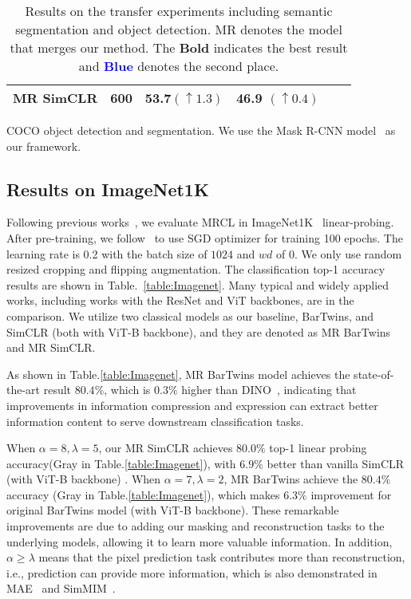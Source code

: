 \documentclass[10pt,twocolumn,letterpaper]{article}
\begin{document}
\begin{table*}[t!]
\begin{subtable}[h]{0.54\textwidth}
\begin{tabular}{l|ccccc}
         MR SimCLR & 600 & \textbf{53.7}$(\uparrow 1.3)$ & \textbf{46.9} $(\uparrow 0.4)$\\
         \bottomrule
    \end{tabular}
        \caption{COCO object detection and segmentation. We use the Mask R-CNN model~\cite{he2017mask} as our framework.}
        \label{tab:COCO}
     \end{subtable}
     \caption{Results on the transfer experiments including semantic segmentation
    and object detection. MR denotes the model that merges our method. The \textbf{Bold} indicates the best result and \textbf{\textcolor{blue}{Blue}} denotes the second place.}
     \label{tab:transfer_exp}
\end{table*}

\subsection{Results on ImageNet1K}
Following previous works~\cite{caron2021emerging,chen2021empirical,chen2020simple,bao2021beit}, we evaluate MRCL in ImageNet1K~\cite{li2021image} linear-probing. After pre-training, we follow~\cite{chen2021empirical} to use SGD optimizer for training 100 epochs. The learning rate is 0.2 with the batch size of $1024$ and $wd$ of 0. We only use random resized cropping and flipping augmentation. The classification top-1 accuracy results are shown in Table.~\ref{table:Imagenet}. Many typical and widely applied works, including works with the ResNet and ViT backbones, are in the comparison. We utilize two classical models as our baseline, BarTwins, and SimCLR (both with ViT-B backbone), and they are denoted as MR BarTwins and MR SimCLR.

As shown in Table.\ref{table:Imagenet}, MR BarTwins model achieves the state-of-the-art result $80.4\%$, which is $0.3\%$ higher than DINO~\cite{caron2021emerging}, indicating that improvements in information compression and expression can extract better information content to serve downstream classification tasks.

When $\alpha=8,\lambda=5$, our MR SimCLR achieves $80.0\%$ top-1 linear probing accuracy(\colorbox{gray!20}{Gray} in Table.\ref{table:Imagenet}), with $6.9\%$ better than vanilla SimCLR (with ViT-B backbone) . When $\alpha=7,\lambda=2$, MR BarTwins achieve the $80.4\%$ accuracy (\colorbox{gray!20}{Gray} in Table.\ref{table:Imagenet}), which makes $6.3\%$ improvement for original BarTwins model (with ViT-B backbone). These remarkable improvements are due to adding our masking and reconstruction tasks to the underlying models, allowing it to learn more valuable information. In addition, $\alpha\ge\lambda$ means that the pixel prediction task contributes more than reconstruction, i.e., prediction can provide more information, which is also demonstrated in MAE~\cite{he2022masked} and SimMIM~\cite{xie2022simmim}.
\end{document}
